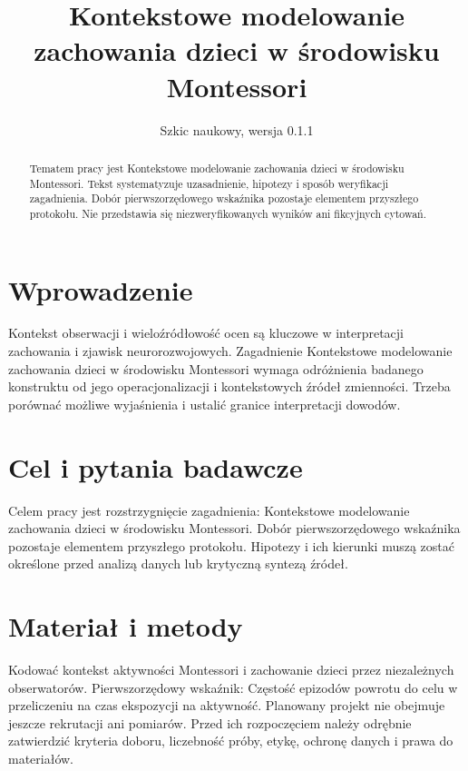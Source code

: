 \documentclass[11pt,a4paper]{article}
\title{Kontekstowe modelowanie zachowania dzieci w środowisku Montessori}
\author{}
\date{Szkic naukowy, wersja 0.1.1}
\begin{document}
\maketitle

\begin{abstract}

Tematem pracy jest Kontekstowe modelowanie zachowania dzieci w środowisku Montessori. Tekst systematyzuje uzasadnienie, hipotezy i sposób weryfikacji zagadnienia. Dobór pierwszorzędowego wskaźnika pozostaje elementem przyszłego protokołu. Nie przedstawia się niezweryfikowanych wyników ani fikcyjnych cytowań.

\end{abstract}

\section{Wprowadzenie}

Kontekst obserwacji i wieloźródłowość ocen są kluczowe w interpretacji zachowania i zjawisk neurorozwojowych. Zagadnienie Kontekstowe modelowanie zachowania dzieci w środowisku Montessori wymaga odróżnienia badanego konstruktu od jego operacjonalizacji i kontekstowych źródeł zmienności. Trzeba porównać możliwe wyjaśnienia i ustalić granice interpretacji dowodów.

\section{Cel i pytania badawcze}

Celem pracy jest rozstrzygnięcie zagadnienia: Kontekstowe modelowanie zachowania dzieci w środowisku Montessori. Dobór pierwszorzędowego wskaźnika pozostaje elementem przyszłego protokołu. Hipotezy i ich kierunki muszą zostać określone przed analizą danych lub krytyczną syntezą źródeł.

\section{Materiał i metody}

Kodować kontekst aktywności Montessori i zachowanie dzieci przez niezależnych obserwatorów. Pierwszorzędowy wskaźnik: Częstość epizodów powrotu do celu w przeliczeniu na czas ekspozycji na aktywność. Planowany projekt nie obejmuje jeszcze rekrutacji ani pomiarów. Przed ich rozpoczęciem należy odrębnie zatwierdzić kryteria doboru, liczebność próby, etykę, ochronę danych i prawa do materiałów.
\end{document}
